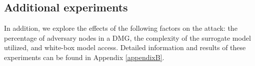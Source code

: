 \documentclass[conference,compsoc]{IEEEtran}
\begin{document}
\begin{table}[htbp]
\centering
\caption{Average execution time (in second) for preparation ($t_{p}$) and optimization ($t_o$), and the corresponding memory usages (in Mb) ($m_p$), and ($m_o$), respectively.}
\label{empiricalcosts}
\end{table}

\par \subsection{Additional experiments}
\par In addition, we explore the effects of the following factors on the attack: the percentage of adversary nodes in a DMG, the complexity of the surrogate model utilized, and white-box model access. Detailed information and results of these experiments can be found in Appendix \ref{appendixB}.
\end{document}

